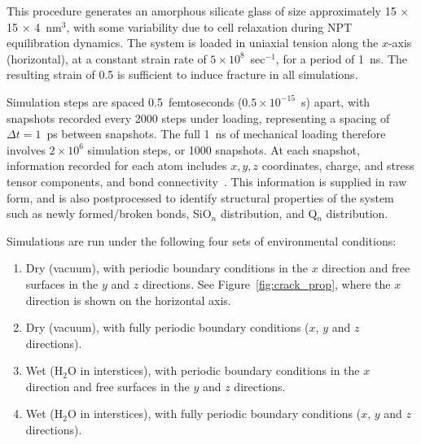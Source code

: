This procedure generates an amorphous silicate glass of size approximately 15 $\times$ 15 $\times$ 4~nm$^3$, with some variability due to cell relaxation during NPT equilibration dynamics.  The system is loaded in uniaxial tension along the $x$-axis (horizontal), at a constant strain rate of $5\times 10^8$~sec$^{-1}$, for a period of 1~ns.  The resulting strain of 0.5 is sufficient to induce fracture in all simulations. %

Simulation steps are spaced 0.5~femtoseconds ($0.5 \times 10^{-15}$~s) apart, with snapshots recorded every 2000 steps under loading, representing a spacing of $\Delta t = 1$~ps between snapshots.  The full 1~ns of mechanical loading therefore involves $2 \times 10^6$ simulation steps, or 1000 snapshots. At each snapshot, information recorded for each atom includes $x,y,z$ coordinates, charge, and stress tensor components, and bond connectivity~\cite{markpres}.  This information is supplied in raw form, and is also postprocessed to identify structural properties of the system such as newly formed/broken bonds, SiO$_n$ distribution, and Q$_n$ distribution.


Simulations are run under the following four sets of environmental conditions:

\begin{enumerate}
    \item Dry (vacuum), with periodic boundary conditions in the $x$ direction and free surfaces in the $y$ and $z$ directions. See Figure~\ref{fig:crack_prop}, where the $x$ direction is shown on the horizontal axis.
    \item Dry (vacuum), with fully periodic boundary conditions ($x$, $y$ and $z$ directions).
    \item Wet (H$_2$O in interstices), with periodic boundary conditions in the $x$ direction and free surfaces in the $y$ and $z$ directions.
    \item Wet (H$_2$O in interstices), with fully periodic boundary conditions ($x$, $y$ and $z$ directions).
\end{enumerate}

